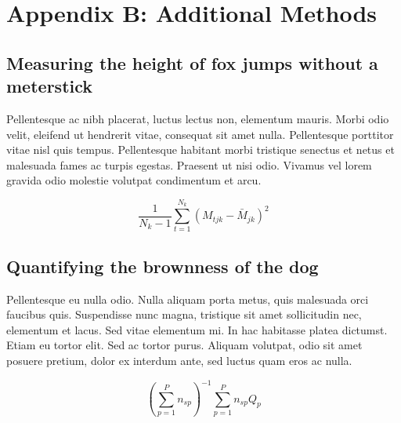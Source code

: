 \documentclass[11pt]{article}
\begin{document}
\section*{Appendix B: Additional Methods}

\subsection*{Measuring the height of fox jumps without a meterstick}

Pellentesque ac nibh placerat, luctus lectus non, elementum mauris. 
Morbi odio velit, eleifend ut hendrerit vitae, consequat sit amet 
nulla. Pellentesque porttitor vitae nisl quis tempus. Pellentesque 
habitant morbi tristique senectus et netus et malesuada fames ac 
turpis egestas. Praesent ut nisi odio. Vivamus vel lorem gravida 
odio molestie volutpat condimentum et arcu. 

\begin{equation}
{ \frac{1}{N_k-1} \sum \limits_{t=1}^{N_k} (M_{tjk} - \bar{M}_{jk})^2}
\end{equation}

\subsection*{Quantifying the brownness of the dog}

Pellentesque eu nulla odio. Nulla aliquam porta metus, quis malesuada orci faucibus quis. Suspendisse nunc magna, tristique sit amet sollicitudin nec, elementum et lacus. Sed vitae elementum mi. In hac habitasse platea dictumst. Etiam eu tortor elit. Sed ac tortor purus. Aliquam volutpat, odio sit amet posuere pretium, dolor ex interdum ante, sed luctus quam eros ac nulla. 

\begin{equation}
{ (\sum \limits_{p=1}^P {n_{sp}})^{-1}\sum \limits_{p=1}^P {n_{sp}Q_{p}}}
\end{equation}

\newpage{}

%
%

\end{document}
